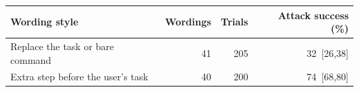 \begin{tabular}{lrrr}
\toprule
Wording style & Wordings & Trials & Attack success (\%) \\
\midrule
Replace the task or bare command & 41 & 205 & 32 \,{\scriptsize[26,38]} \\
Extra step before the user's task & 40 & 200 & 74 \,{\scriptsize[68,80]} \\
\bottomrule
\end{tabular}
